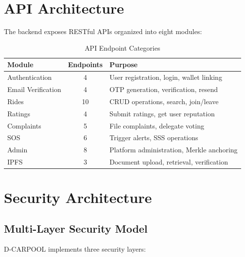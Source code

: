 \section{API Architecture}

The backend exposes RESTful APIs organized into eight modules:

\begin{table}[H]
\centering
\caption{API Endpoint Categories}
\begin{tabular}{|l|c|l|}
\hline
\textbf{Module} & \textbf{Endpoints} & \textbf{Purpose} \\
\hline
Authentication & 4 & User registration, login, wallet linking \\
Email Verification & 4 & OTP generation, verification, resend \\
Rides & 10 & CRUD operations, search, join/leave \\
Ratings & 4 & Submit ratings, get user reputation \\
Complaints & 5 & File complaints, delegate voting \\
SOS & 6 & Trigger alerts, SSS operations \\
Admin & 8 & Platform administration, Merkle anchoring \\
IPFS & 3 & Document upload, retrieval, verification \\
\hline
\end{tabular}
\end{table}

\section{Security Architecture}

\subsection{Multi-Layer Security Model}

D-CARPOOL implements three security layers:

